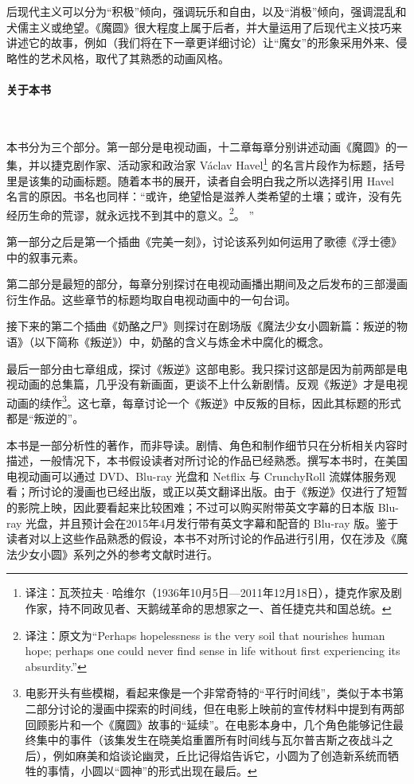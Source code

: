 后现代主义可以分为“积极”倾向，强调玩乐和自由，以及“消极”倾向，强调混乱和犬儒主义或绝望\cite{ref6}。《魔圆》很大程度上属于后者，并大量运用了后现代主义技巧来讲述它的故事，例如（我们将在下一章更详细讨论）让“魔女”的形象采用外来、侵略性的艺术风格，取代了其熟悉的动画风格。
\paragraph{关于本书}~{}

本书分为三个部分。第一部分是电视动画，十二章每章分别讲述动画《魔圆》的一集，并以捷克剧作家、活动家和政治家 Václav Havel\footnote{译注：瓦茨拉夫·哈维尔（1936年10月5日—2011年12月18日），捷克作家及剧作家，持不同政见者、天鹅绒革命的思想家之一、首任捷克共和国总统。} 的名言片段作为标题，括号里是该集的动画标题。随着本书的展开，读者自会明白我之所以选择引用 Havel 名言的原因。书名也同样：“或许，绝望恰是滋养人类希望的土壤；或许，没有先经历生命的荒谬，就永远找不到其中的意义。\footnote{译注：原文为``Perhaps hopelessness is the very soil that nourishes human hope; perhaps one could never find sense in life without first experiencing its absurdity.'' }\cite{ref7}。 ” 

第一部分之后是第一个插曲《完美一刻》，讨论该系列如何运用了歌德《浮士德》中的叙事元素。

第二部分是最短的部分，每章分别探讨在电视动画播出期间及之后发布的三部漫画衍生作品。这些章节的标题均取自电视动画中的一句台词。

接下来的第二个插曲《奶酪之尸》则探讨在剧场版《魔法少女小圆新篇：叛逆的物语》（以下简称《叛逆》）中，奶酪的含义与炼金术中腐化的概念。

最后一部分由七章组成，探讨《叛逆》这部电影。我只探讨这部是因为前两部是电视动画的总集篇，几乎没有新画面，更谈不上什么新剧情。反观《叛逆》才是电视动画的续作\footnote{电影开头有些模糊，看起来像是一个非常奇特的“平行时间线”，类似于本书第二部分讨论的漫画中探索的时间线，但在电影上映前的宣传材料中提到有两部回顾影片和一个《魔圆》故事的“延续”。在电影本身中，几个角色能够记住最终集中的事件（该集发生在晓美焰重置所有时间线与瓦尔普吉斯之夜战斗之后），例如麻美和焰谈论幽灵，丘比记得焰告诉它，小圆为了创造新系统而牺牲的事情，小圆以“圆神”的形式出现在最后。}。这七章，每章讨论一个《叛逆》中反叛的目标，因此其标题的形式都是“叛逆的\underline{\makebox[1cm]{}}”。

本书是一部分析性的著作，而非导读。剧情、角色和制作细节只在分析相关内容时描述，一般情况下，本书假设读者对所讨论的作品已经熟悉。撰写本书时，在美国电视动画可以通过 DVD、Blu-ray 光盘和 Netflix 与 CrunchyRoll 流媒体服务观看；所讨论的漫画也已经出版，或正以英文翻译出版。由于《叛逆》仅进行了短暂的影院上映，因此要看起来比较困难；不过可以购买附带英文字幕的日本版 Blu-ray 光盘，并且预计会在2015年4月发行带有英文字幕和配音的 Blu-ray 版。鉴于读者对以上这些作品熟悉的假设，本书不对所讨论的作品进行引用，仅在涉及《魔法少女小圆》系列之外的参考文献时进行。


